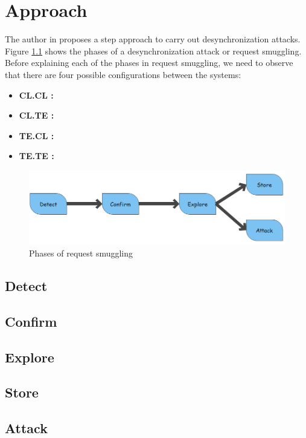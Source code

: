 \chapter{Approach}
The author in \cite{b6} proposes a step approach to carry out desynchronization attacks. Figure \ref{fig:Phases} shows the phases of a desynchronization attack or request smuggling. Before explaining each of the phases in request smuggling, we need to observe that there are four possible configurations between the systems:
\begin{itemize}
	\item \textbf{CL.CL : } 
	\item \textbf{CL.TE : } 
	\item \textbf{TE.CL : } 
	\item \textbf{TE.TE : } 
\end{itemize}
\begin{figure}
	\includegraphics[width=14cm]{images/Phases}
	\caption{Phases of request smuggling}
	\label{fig:Phases}
\end{figure}
\section{Detect}
\section{Confirm}
\section{Explore}
\section{Store}
\section{Attack}